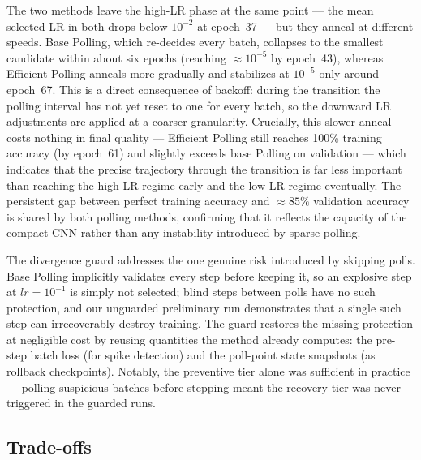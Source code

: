 \documentclass[conference]{IEEEtran}
\begin{document}
The two methods leave the high-LR phase at the same point --- the mean selected LR in both drops below $10^{-2}$ at epoch~37 --- but they anneal at different speeds. Base Polling, which re-decides every batch, collapses to the smallest candidate within about six epochs (reaching $\approx 10^{-5}$ by epoch~43), whereas Efficient Polling anneals more gradually and stabilizes at $10^{-5}$ only around epoch~67. This is a direct consequence of backoff: during the transition the polling interval has not yet reset to one for every batch, so the downward LR adjustments are applied at a coarser granularity. Crucially, this slower anneal costs nothing in final quality --- Efficient Polling still reaches 100\% training accuracy (by epoch~61) and slightly exceeds base Polling on validation --- which indicates that the precise trajectory through the transition is far less important than reaching the high-LR regime early and the low-LR regime eventually. The persistent gap between perfect training accuracy and $\approx 85\%$ validation accuracy is shared by both polling methods, confirming that it reflects the capacity of the compact CNN rather than any instability introduced by sparse polling.

The divergence guard addresses the one genuine risk introduced by skipping polls. Base Polling implicitly validates every step before keeping it, so an explosive step at $lr = 10^{-1}$ is simply not selected; blind steps between polls have no such protection, and our unguarded preliminary run demonstrates that a single such step can irrecoverably destroy training. The guard restores the missing protection at negligible cost by reusing quantities the method already computes: the pre-step batch loss (for spike detection) and the poll-point state snapshots (as rollback checkpoints). Notably, the preventive tier alone was sufficient in practice --- polling suspicious batches before stepping meant the recovery tier was never triggered in the guarded runs.

\subsection{Trade-offs}
\end{document}
